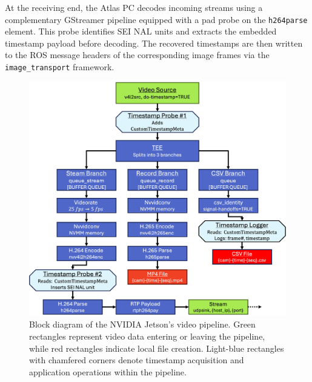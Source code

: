 \documentclass[../main.tex]{subfiles}
\begin{document}
At the receiving end, the Atlas PC decodes incoming streams using a complementary GStreamer pipeline equipped with a pad probe on the \texttt{h264parse} element. This probe identifies SEI NAL units and extracts the embedded timestamp payload before decoding. The recovered timestamps are then written to the ROS message headers of the corresponding image frames via the \texttt{image\_transport} framework.


\begin{figure}[htbp]
\centering
\includegraphics[width=5in]{Images/gstreamer_block.png}
\caption{Block diagram of the NVIDIA Jetson's video pipeline. Green rectangles represent video data entering or leaving the pipeline, while red rectangles indicate local file creation. Light-blue rectangles with chamfered corners denote timestamp acquisition and application operations within the pipeline.}
\label{video_pipeline}
\end{figure}
\end{document}
